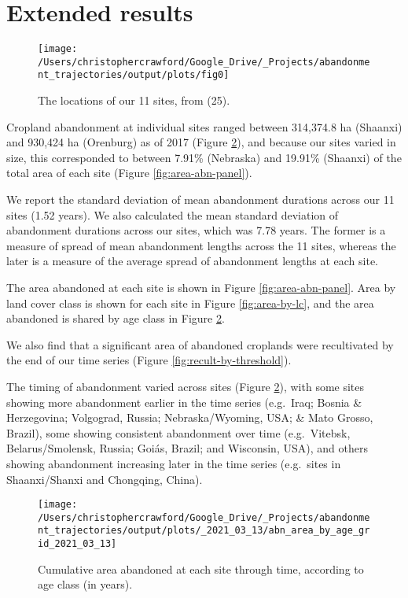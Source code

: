 \documentclass[9pt,twocolumn,twoside,]{pnas-new}
\begin{document}
\hypertarget{results-si}{%
\section{Extended results}\label{results-si}}



\begin{figure}
\texttt{[image: /Users/christophercrawford/Google\_Drive/\_Projects/abandonment\_trajectories/output/plots/fig0]} \caption{The locations of our 11 sites, from (25).}\label{fig:global-map}
\end{figure}

Cropland abandonment at individual sites ranged between 314,374.8 ha (Shaanxi) and 930,424 ha (Orenburg) as of 2017 (Figure \ref{fig:area-abn-by-age-class}), and because our sites varied in size, this corresponded to between 7.91\% (Nebraska) and 19.91\% (Shaanxi) of the total area of each site (Figure \ref{fig:area-abn-panel}).

We report the standard deviation of mean abandonment durations across our 11 sites (1.52 years).
We also calculated the mean standard deviation of abandonment durations across our sites, which was 7.78 years.
The former is a measure of spread of mean abandonment lengths across the 11 sites, whereas the later is a measure of the average spread of abandonment lengths at each site.

The area abandoned at each site is shown in Figure \ref{fig:area-abn-panel}.
Area by land cover class is shown for each site in Figure \ref{fig:area-by-lc}, and the area abandoned is shared by age class in Figure \ref{fig:area-abn-by-age-class}.

We also find that a significant area of abandoned croplands were recultivated by the end of our time series (Figure \ref{fig:recult-by-threshold}).

The timing of abandonment varied across sites (Figure \ref{fig:area-abn-by-age-class}), with some sites showing more abandonment earlier in the time series (e.g.~Iraq; Bosnia \& Herzegovina; Volgograd, Russia; Nebraska/Wyoming, USA; \& Mato Grosso, Brazil), some showing consistent abandonment over time (e.g.~Vitebsk, Belarus/Smolensk, Russia; Goiás, Brazil; and Wisconsin, USA), and others showing abandonment increasing later in the time series (e.g.~sites in Shaanxi/Shanxi and Chongqing, China).



\begin{figure}
\texttt{[image: /Users/christophercrawford/Google\_Drive/\_Projects/abandonment\_trajectories/output/plots/\_2021\_03\_13/abn\_area\_by\_age\_grid\_2021\_03\_13]} \caption{Cumulative area abandoned at each site through time, according to age class (in years).}\label{fig:area-abn-by-age-class}
\end{figure}
\end{document}
